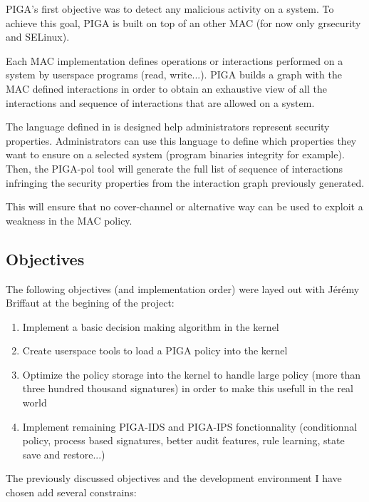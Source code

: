 \documentclass[pdftex,a4paper,titlepage,11pt]{article}
\begin{document}
PIGA's first objective was to detect any malicious activity on a system. To
achieve this goal, PIGA is built on top of an other MAC (for now only grsecurity
and SELinux).

\bigskip

Each MAC implementation defines operations or interactions performed on a system
by userspace programs (read, write...). PIGA  builds a graph with the MAC
defined interactions in order to obtain an exhaustive view of all the
interactions and sequence of interactions that are allowed on a system.

\bigskip

The language defined in \cite{THESEBRIFFAUT} is designed help administrators
represent security properties. Administrators can use this language to define
which properties they want to ensure on a selected system (program binaries
integrity for example). Then, the PIGA-pol tool will generate the full list of
sequence of interactions infringing the security properties from the interaction
graph previously generated.

\bigskip

This will ensure that no cover-channel or alternative way can be used to exploit
a weakness in the MAC policy.

\subsection{Objectives}

The following objectives (and implementation order) were layed out with Jérémy
Briffaut at the begining of the project:

\begin{enumerate}
	\item Implement a basic decision making algorithm in the kernel
	\item Create userspace tools to load a PIGA policy into the kernel
	\item Optimize the policy storage into the kernel to handle large policy
(more than three hundred thousand signatures) in order to make this usefull in
the real world
	\item Implement remaining PIGA-IDS and PIGA-IPS fonctionnality (conditionnal
policy, process based signatures, better audit features, rule learning, state
save and restore...)
\end{enumerate}

\smallskip

The previously discussed objectives and the development environment I have
chosen add several constrains:
\end{document}

